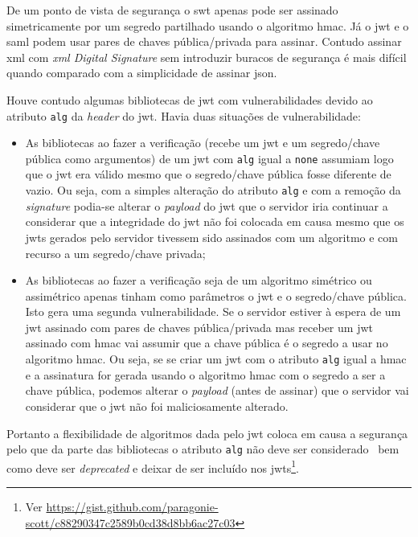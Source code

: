 De um ponto de vista de segurança o \acrshort{swt} apenas pode ser assinado simetricamente por um segredo 
partilhado usando o algoritmo \acrshort{hmac}. Já o \acrshort{jwt} e o \acrshort{saml} podem usar pares de 
chaves pública/privada para assinar. Contudo assinar \acrshort{xml} com 
\textit{\acrshort{xml} Digital Signature} sem introduzir buracos de segurança é mais difícil quando comparado 
com a simplicidade de assinar \acrshort{json}.~\cite{jwtio}

Houve contudo algumas bibliotecas de \acrshort{jwt} com vulnerabilidades devido ao atributo \texttt{alg} da 
\textit{header} do \acrshort{jwt}. Havia duas situações de vulnerabilidade:
\begin{itemize}
    \item As bibliotecas ao fazer a verificação (recebe um \acrshort{jwt} e um segredo/chave pública como 
    argumentos) de um \acrshort{jwt} com \texttt{alg} igual a \texttt{none} assumiam logo que o \acrshort{jwt} 
    era válido mesmo que o segredo/chave pública fosse diferente de vazio. Ou seja, com a simples alteração do 
    atributo \texttt{alg} e com a remoção da \textit{signature} podia-se alterar o \textit{payload} do 
    \acrshort{jwt} que o servidor iria continuar a considerar que a integridade do \acrshort{jwt} não foi colocada 
    em causa mesmo que os \acrshort{jwt}s gerados pelo servidor tivessem sido assinados com um algoritmo e 
    com recurso 
    a um segredo/chave privada;

    \item As bibliotecas ao fazer a verificação seja de um algoritmo simétrico ou assimétrico apenas tinham 
    como parâmetros o \acrshort{jwt} e o segredo/chave pública. Isto gera uma segunda vulnerabilidade. Se o 
    servidor estiver à espera de um \acrshort{jwt} assinado com pares de chaves pública/privada mas receber 
    um \acrshort{jwt} assinado com \acrshort{hmac} vai assumir que a chave pública é o segredo a usar no algoritmo 
    \acrshort{hmac}. Ou seja, se se criar um \acrshort{jwt} com o atributo \texttt{alg} igual a \acrshort{hmac} 
    e a assinatura for gerada usando o algoritmo \acrshort{hmac} com o segredo a ser a chave pública, podemos 
    alterar o \textit{payload} (antes de assinar) que o servidor vai considerar que o \acrshort{jwt} não foi 
    maliciosamente alterado.
\end{itemize}

Portanto a flexibilidade de algoritmos dada pelo \acrshort{jwt} coloca em causa a segurança pelo que da parte das 
bibliotecas o atributo \texttt{alg} não deve ser considerado~\cite{jwtvuln} bem como deve ser \textit{deprecated} 
e deixar de ser incluído nos 
\acrshort{jwt}s\footnote{Ver \url{https://gist.github.com/paragonie-scott/c88290347c2589b0cd38d8bb6ac27c03}}. 

